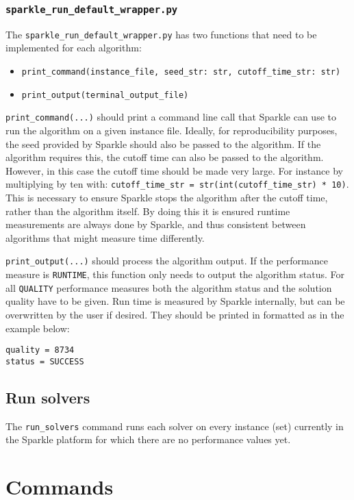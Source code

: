 \documentclass{article}
\begin{document}
\subsubsection{\texttt{sparkle\_run\_default\_wrapper.py}}
The \texttt{sparkle\_run\_default\_wrapper.py} has two functions that need to be implemented for each algorithm:

\begin{itemize}[noitemsep]
  \item \texttt{print\_command(instance\_file, seed\_str: str, cutoff\_time\_str: str)}
  \item \texttt{print\_output(terminal\_output\_file)}
\end{itemize}

\texttt{print\_command(...)} should print a command line call that Sparkle can use to run the algorithm on a given instance file. Ideally, for reproducibility purposes, the seed provided by Sparkle should also be passed to the algorithm. If the algorithm requires this, the cutoff time can also be passed to the algorithm. However, in this case the cutoff time should be made very large. For instance by multiplying by ten with: \texttt{cutoff\_time\_str = str(int(cutoff\_time\_str) * 10)}. This is necessary to ensure Sparkle stops the algorithm after the cutoff time, rather than the algorithm itself. By doing this it is ensured runtime measurements are always done by Sparkle, and thus consistent between algorithms that might measure time differently.

\texttt{print\_output(...)} should process the algorithm output. If the performance measure is \texttt{RUNTIME}, this function only needs to output the algorithm status. For all \texttt{QUALITY} performance measures both the algorithm status and the solution quality have to be given. Run time is measured by Sparkle internally, but can be overwritten by the user if desired. They should be printed in formatted as in the example below:
\begin{verbatim}
quality = 8734
status = SUCCESS
\end{verbatim}

\subsection{Run solvers}
The \texttt{run\_solvers} command runs each solver on every instance (set) currently in the Sparkle platform for which there are no performance values yet.

\section{Commands}
\end{document}
